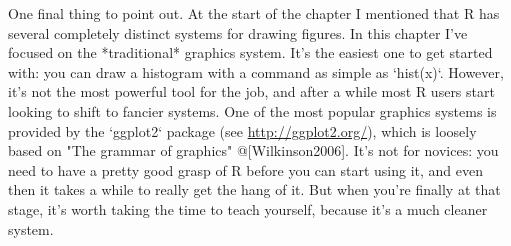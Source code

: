 One final thing to point out. At the start of the chapter I mentioned that R has several completely distinct systems for drawing figures. In this chapter I've focused on the *traditional* graphics system. It's the easiest one to get started with: you can draw a histogram with a command as simple as `hist(x)`. However, it's not the most powerful tool for the job, and after a while most R users start looking to shift to fancier systems. One of the most popular graphics systems is provided by the `ggplot2` package (see \url{http://ggplot2.org/}), which is loosely based on "The grammar of graphics" @[Wilkinson2006]. It's not for novices: you need to have a pretty good grasp of R before you can start using it, and even then it takes a while to really get the hang of it. But when you're finally at that stage, it's worth taking the time to teach yourself, because it's a much cleaner system.



